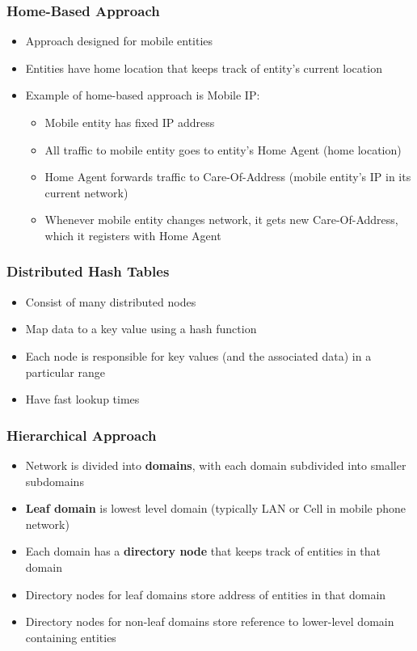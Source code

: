 \subsubsection{Home-Based Approach}
\begin{itemize}
	\item Approach designed for mobile entities
	\item Entities have home location that keeps track of entity's current location
	\item Example of home-based approach is Mobile IP:
	\begin{itemize}
		\item Mobile entity has fixed IP address
		\item All traffic to mobile entity goes to entity's Home Agent (home location)
		\item Home Agent forwards traffic to Care-Of-Address (mobile entity's IP in its current network)
		\item Whenever mobile entity changes network, it gets new Care-Of-Address, which it registers with Home Agent
	\end{itemize}	
\end{itemize}

\subsubsection{Distributed Hash Tables}
\begin{itemize}
	\item Consist of many distributed nodes
	\item Map data to a key value using a hash function
	\item Each node is responsible for key values (and the associated data) in a particular range
	\item Have fast lookup times	
\end{itemize}

\subsubsection{Hierarchical Approach}
\begin{itemize}
	\item Network is divided into \textbf{domains}, with each domain subdivided into smaller subdomains
	\item \textbf{Leaf domain} is lowest level domain (typically LAN or Cell in mobile phone network)
	\item Each domain has a \textbf{directory node} that keeps track of entities in that domain
	\item Directory nodes for leaf domains store address of entities in that domain
	\item Directory nodes for non-leaf domains store reference to lower-level domain containing entities	
\end{itemize}

